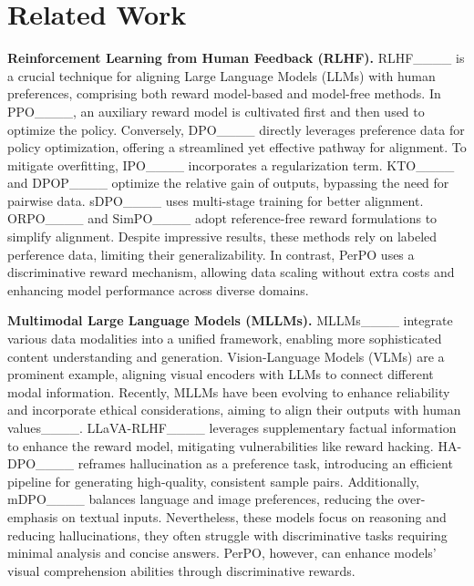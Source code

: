 \section{Related Work}
\textbf{Reinforcement Learning from Human Feedback (RLHF).} 
RLHF____ is a crucial technique for aligning Large Language Models (LLMs) with human preferences, comprising both reward model-based and model-free methods. In PPO____, an auxiliary reward model is cultivated first and then used to optimize the policy. Conversely, DPO____ directly leverages preference data for policy optimization, offering a streamlined yet effective pathway for alignment. To mitigate overfitting, IPO____ incorporates a regularization term. KTO____ and DPOP____ optimize the relative gain of outputs, bypassing the need for pairwise data. sDPO____ uses multi-stage training for better alignment. ORPO____ and SimPO____ adopt reference-free reward formulations to simplify alignment. Despite impressive results, these methods rely on labeled perference data, limiting their generalizability. In contrast, PerPO uses a discriminative reward mechanism, allowing data scaling without extra costs and enhancing model performance across diverse domains.




\textbf{Multimodal Large Language Models (MLLMs).} 
MLLMs____ integrate various data modalities into a unified framework, enabling more sophisticated content understanding and generation. Vision-Language Models (VLMs) are a prominent example, aligning visual encoders with LLMs to connect different modal information. Recently, MLLMs have been evolving to enhance reliability and incorporate ethical considerations, aiming to align their outputs with human values____. LLaVA-RLHF____ leverages supplementary factual information to enhance the reward model, mitigating vulnerabilities like reward hacking. HA-DPO____ reframes hallucination as a preference task, introducing an efficient pipeline for generating high-quality, consistent sample pairs. Additionally, mDPO____ balances language and image preferences, reducing the over-emphasis on textual inputs. Nevertheless, these models focus on reasoning and reducing hallucinations, they often struggle with discriminative tasks requiring minimal analysis and concise answers. PerPO, however, can enhance models' visual comprehension abilities through discriminative rewards. 





